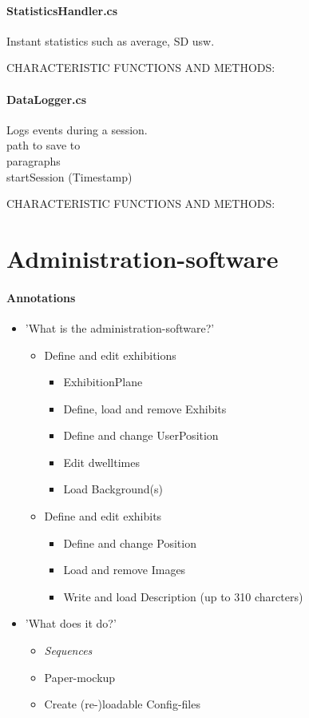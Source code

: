 \paragraph{StatisticsHandler.cs} Instant statistics such as average, SD usw. 

CHARACTERISTIC FUNCTIONS AND METHODS: 


\paragraph{DataLogger.cs} Logs events during a session.
\\
path to save to
\\
paragraphs
\\
startSession (Timestamp)

CHARACTERISTIC FUNCTIONS AND METHODS: 


\section{Administration-software}
\label{implementation_administration}

\paragraph{Annotations}

\begin{itemize}
	\item 'What is the administration-software?'
	\begin{itemize}
		\item Define and edit exhibitions
		\begin{itemize}
			\item ExhibitionPlane
			\item Define, load and remove Exhibits
			\item Define and change UserPosition
			\item Edit dwelltimes
			\item Load Background(s)
		\end{itemize}
		\item Define and edit exhibits
		\begin{itemize}
			\item Define and change Position
			\item Load and remove Images
			\item Write and load Description (up to 310 charcters)
		\end{itemize}
	\end{itemize}
	\item 'What does it do?'
	\begin{itemize}
		\item \textit{Sequences}
		\item Paper-mockup
		\item Create (re-)loadable Config-files
	\end{itemize}
\end{itemize}



